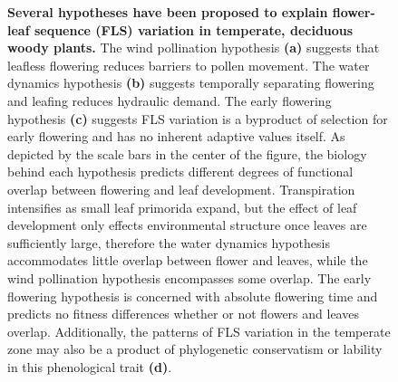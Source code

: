 \documentclass[11.5 pt]{article}\usepackage[]{graphicx}\usepackage[]{color}
\begin{document}
\begin{figure}[h!]
    \centering
    \caption{\textbf{Several hypotheses have been proposed to explain flower-leaf sequence (FLS) variation in temperate, deciduous woody plants.}  The wind pollination hypothesis \textbf{(a)} suggests that leafless flowering reduces barriers to pollen movement. The water dynamics hypothesis \textbf{(b)} suggests temporally separating flowering and leafing reduces hydraulic demand. The early flowering hypothesis \textbf{(c)} suggests FLS variation is a byproduct of selection for early flowering and has no inherent adaptive values itself. As depicted by the scale bars in the center of the figure, the biology behind each hypothesis predicts different degrees of functional overlap between flowering and leaf development. Transpiration intensifies as small leaf primorida expand, but the effect of leaf development only effects environmental structure once leaves are sufficiently large, therefore the water dynamics hypothesis accommodates little overlap between flower and leaves, while the wind pollination hypothesis encompasses some overlap. The early flowering hypothesis is concerned with absolute flowering time and predicts no fitness differences whether or not flowers and leaves overlap. Additionally, the patterns of FLS variation in the temperate zone may also be a product of phylogenetic conservatism or lability in this phenological trait \textbf{(d)}.}
    \label{fig:conceptual}
\end{figure}
\end{document}
